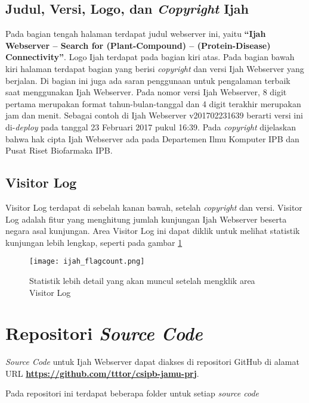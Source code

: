 	\subsection{Judul, Versi, Logo, dan \emph{Copyright} Ijah} \label{judul}
	Pada bagian tengah halaman terdapat judul webserver ini, yaitu \textbf{``Ijah Webserver -- Search for (Plant-Compound) -- (Protein-Disease) Connectivity''}. Logo Ijah terdapat pada bagian kiri atas. Pada bagian bawah kiri halaman terdapat bagian yang berisi \emph{copyright} dan versi Ijah Webserver yang berjalan. Di bagian ini juga ada saran penggunaan untuk pengalaman terbaik saat menggunakan Ijah Webserver. Pada nomor versi Ijah Webserver, 8 digit pertama merupakan format tahun-bulan-tanggal dan 4 digit terakhir merupakan jam dan menit. Sebagai contoh di Ijah Webserver v201702231639 berarti versi ini di-\emph{deploy} pada tanggal 23 Februari 2017 pukul 16:39. Pada \emph{copyright} dijelaskan bahwa hak cipta Ijah Webserver ada pada Departemen Ilmu Komputer IPB dan Pusat Riset Biofarmaka IPB.


	\subsection{Visitor Log} \label{visitor log}
	Visitor Log terdapat di sebelah kanan bawah, setelah \emph{copyright} dan versi. Visitor Log adalah fitur yang menghitung jumlah kunjungan Ijah Webserver beserta negara asal kunjungan. Area Visitor Log ini dapat diklik untuk melihat statistik kunjungan lebih lengkap, seperti pada gambar \ref{fig:ijah_flagcount}

	\begin{figure}[H]
	\centering
	\texttt{[image: ijah\_flagcount.png]}
	\caption{Statistik lebih detail yang akan muncul setelah mengklik area Visitor Log}
	\label{fig:ijah_flagcount}
	\end{figure}

\section{Repositori \emph{Source Code}} \label{ws_source}
\emph{Source Code} untuk Ijah Webserver dapat diakses di repositori GitHub di alamat URL \href{https://github.com/tttor/csipb-jamu-prj}{\textbf{https://github.com/tttor/csipb-jamu-prj}}.

Pada repositori ini terdapat beberapa folder untuk setiap \emph{source code}


